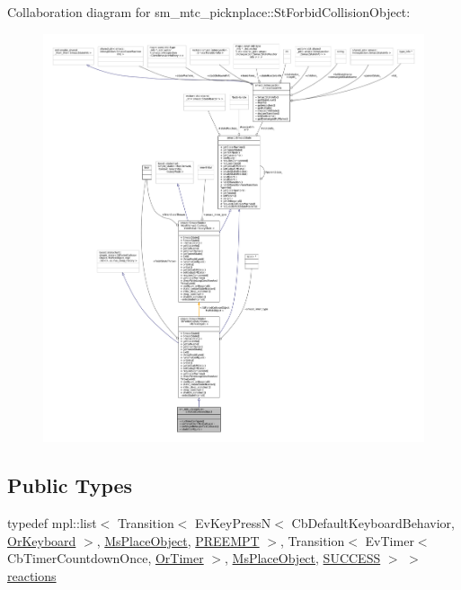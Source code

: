 Collaboration diagram for sm\+\_\+mtc\+\_\+picknplace\+:\+:St\+Forbid\+Collision\+Object\+:
\nopagebreak
\begin{figure}[H]
\begin{center}
\leavevmode
\includegraphics[width=350pt]{structsm__mtc__picknplace_1_1StForbidCollisionObject__coll__graph}
\end{center}
\end{figure}
\subsection*{Public Types}
\begin{DoxyCompactItemize}
\item 
typedef mpl\+::list$<$ Transition$<$ Ev\+Key\+PressN$<$ Cb\+Default\+Keyboard\+Behavior, \hyperlink{classsm__mtc__picknplace_1_1OrKeyboard}{Or\+Keyboard} $>$, \hyperlink{classsm__mtc__picknplace_1_1MsPlaceObject}{Ms\+Place\+Object}, \hyperlink{classPREEMPT}{P\+R\+E\+E\+M\+PT} $>$, Transition$<$ Ev\+Timer$<$ Cb\+Timer\+Countdown\+Once, \hyperlink{classsm__mtc__picknplace_1_1OrTimer}{Or\+Timer} $>$, \hyperlink{classsm__mtc__picknplace_1_1MsPlaceObject}{Ms\+Place\+Object}, \hyperlink{classSUCCESS}{S\+U\+C\+C\+E\+SS} $>$ $>$ \hyperlink{structsm__mtc__picknplace_1_1StForbidCollisionObject_a8b89f5c16207c0fc5640249341754517}{reactions}
\end{DoxyCompactItemize}
